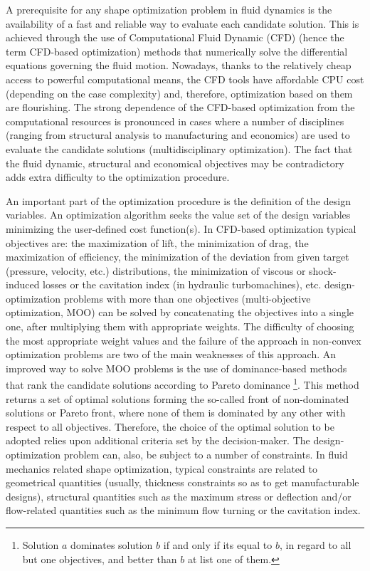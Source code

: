 A prerequisite for any shape optimization problem in fluid dynamics is the availability of a fast and reliable way to evaluate each candidate solution. This is achieved through the use of Computational Fluid Dynamic (CFD) (hence the term CFD-based optimization) methods that numerically solve the differential equations governing the fluid motion. Nowadays, thanks to the relatively cheap access to powerful computational means, the CFD tools have affordable CPU cost (depending on the case complexity) and, therefore, optimization based on them are flourishing. The strong dependence of the CFD-based optimization from the computational resources is pronounced in cases where a number of disciplines (ranging from structural analysis to manufacturing and economics) are used to evaluate the candidate solutions (multidisciplinary optimization). The fact that the fluid dynamic, structural and economical objectives may be contradictory adds extra difficulty to the optimization procedure.           
 
An important part of the optimization procedure is the definition of the design variables. An optimization algorithm seeks the value set of the design variables minimizing the user-defined cost function(s).  In CFD-based optimization typical objectives are: the maximization of lift, the minimization of drag, the maximization of efficiency, the minimization of the deviation from given target (pressure, velocity, etc.) distributions, the minimization of viscous or shock-induced losses or the cavitation index (in hydraulic turbomachines), etc.  design-optimization problems with more than one objectives (multi-objective optimization, MOO) can be solved by concatenating the objectives into a single one, after multiplying them with appropriate weights. The difficulty of choosing the most appropriate weight values and the failure of the approach in non-convex optimization problems are two of the main weaknesses of this approach.  An improved way to solve MOO problems is the use of dominance-based methods that rank the candidate solutions according to Pareto dominance \footnote{Solution $a$ dominates solution $b$ if and only if its equal to $b$, in regard to all but one objectives, and better than $b$ at list one of them.}. This method returns a set of optimal solutions forming the so-called front of non-dominated solutions or Pareto front, where none of them is dominated by any other with respect to all objectives.  Therefore, the choice of the optimal solution to be adopted relies upon additional criteria set by the decision-maker.  The design-optimization problem can, also, be subject to a number of constraints. In fluid mechanics related shape optimization, typical constraints are related to geometrical quantities (usually, thickness constraints so as to get manufacturable designs), structural quantities such as the maximum stress or deflection and/or flow-related quantities such as the minimum flow turning or the cavitation index.          

